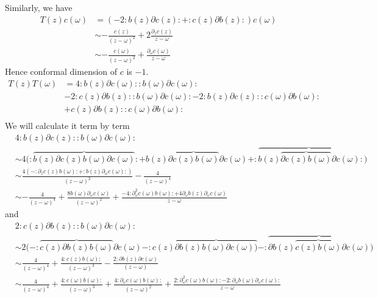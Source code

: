 \documentclass[11pt,a4paper]{article}
\theoremstyle{definition}
\begin{document}
 Similarly, we have
 \[
 \begin{aligned}
 T(z) c(\omega) & = (-2: b(z) \partial c(z): + :c(z) \partial b(z):) c(\omega)\\
 & \sim - \frac{c(z)}{(z-\omega)^2} + 2\frac{\partial_z c(z)}{z-\omega}\\
 & \sim -\frac{c(\omega)}{(z-\omega)^2} + \frac{\partial_\omega c(\omega)}{z-\omega}
 \end{aligned}
 \]
Hence conformal dimension of $c$ is $-1$.
 \[
 \begin{aligned}
 T(z)T(\omega)&= 4 :b(z) \partial c(\omega): : b(\omega) \partial c(\omega):\\
 & - 2: c(z) \partial b(z) :: b(\omega) \partial c(\omega): - 2: b(z) \partial c(z):: c(\omega) \partial b(\omega):\\
 & + c(z)\partial b(z) :: c(\omega) \partial b(\omega):\\
 \end{aligned}
 \]
 We will calculate it term by term
 \[
 \begin{aligned}
& 4:b(z) \partial c(z):: b(\omega) \partial c(\omega):\\
&\sim 4 \Big(: \overbrace{b(z) \partial c(z)b(\omega) \partial c(\omega)}: + b(z)  \overbrace{\partial c(z)  b(\omega)} \partial c(\omega)+: \overbrace{b(z) \overbrace{\partial c(z) b(\omega)} \partial c(\omega)}: \Big)\\
& \sim \frac{4(-: \partial_z c(z) b(\omega): +: b(z) \partial_\omega c(\omega):)}{(z-\omega)^2} - \frac{4}{(z-\omega)^4}\\
& \sim - \frac{4}{(z-\omega)^4}+\frac{8b(\omega) \partial_\omega c(\omega)}{(z-\omega)^2} + \frac{-4: \partial^2_\omega c(\omega) b(\omega): + 4 \partial_\omega b(z) \partial_\omega c(\omega)}{z-\omega}
 \end{aligned}
 \]
 and
 \[
\begin{aligned}
 &2: c(z) \partial b(z) :: b(\omega) \partial c(\omega):\\
 &
 \sim 2\Big( -: \overbrace{c(z) \partial b(z) b(\omega)} \partial c(\omega) - :c(z)\overbrace{\partial b(z) b(\omega) \partial c(\omega))} - :\overbrace{\partial b(z) \overbrace{c(z) b(\omega)} \partial c(\omega)} \Big)\\
 & \sim  \frac{4}{(z-\omega)^4} + \frac{4: c(z) b(\omega):}{(z-\omega)^3} - \frac{2: \partial b(z) \partial c(\omega)}{(z-\omega)} \\
 & \sim \frac{4}{(z-\omega)^4} + \frac{4:c(\omega) b(\omega):}{(z-\omega)^3} + \frac{4 :\partial_\omega c(\omega) b(\omega):}{(z-\omega)^2} + \frac{2: \partial_\omega^2 c(\omega) b(\omega): -2 : \partial_\omega b(\omega) \partial_\omega c(\omega):}{z-\omega}
\end{aligned}
 \]
\end{document}
